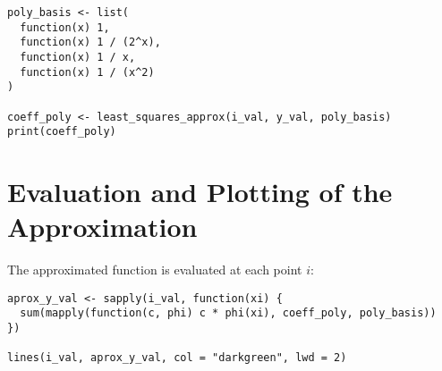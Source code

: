 \documentclass[a4paper,12pt]{article}
\begin{document}
\begin{lstlisting}[caption=Define basis functions and compute coefficients]
poly_basis <- list(
  function(x) 1,
  function(x) 1 / (2^x),
  function(x) 1 / x,
  function(x) 1 / (x^2)
)

coeff_poly <- least_squares_approx(i_val, y_val, poly_basis)
print(coeff_poly)
\end{lstlisting}

\section{Evaluation and Plotting of the Approximation}
The approximated function is evaluated at each point $i$:

\begin{lstlisting}[caption=Evaluate and plot the approximation]
aprox_y_val <- sapply(i_val, function(xi) {
  sum(mapply(function(c, phi) c * phi(xi), coeff_poly, poly_basis))
})

lines(i_val, aprox_y_val, col = "darkgreen", lwd = 2)
\end{lstlisting}
\end{document}
